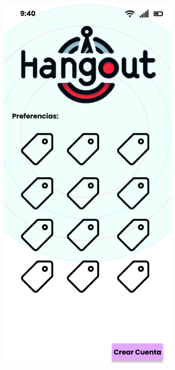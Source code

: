 \clearpage
\vspace*{\fill}
\begin{figure}[H]
    \centering
    \begin{subfigure}{0.45\textwidth}
        \centering
        \includegraphics[width=\linewidth]{imagenes/mockup3.png}

\end{subfigure}
\end{figure}
